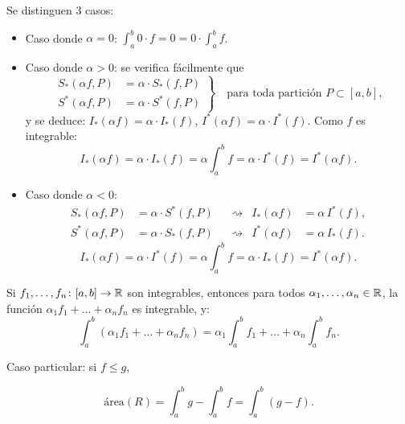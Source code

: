\documentclass[11pt,a4paper]{article}
\begin{document}
Se distinguen 3 casos:
\begin{itemize}
  \item Caso donde $\alpha=0$: $\displaystyle\int_a^b 0\cdot f=0=0\cdot\int_a^b f$.
  \item Caso donde $\alpha>0$: se verifica fácilmente que
  \[
    \left.\begin{aligned}
      S_*(\alpha f,P)&=\alpha\cdot S_*(f,P)\\
      S^*(\alpha f,P)&=\alpha\cdot S^*(f,P)
    \end{aligned}\right\}\quad\text{para toda partición } P\subset[a,b],
  \]
  y se deduce: $I_*(\alpha f)=\alpha\cdot I_*(f)$, $I^*(\alpha f)=\alpha\cdot I^*(f)$.
  Como $f$ es integrable:
  \[
    I_*(\alpha f)=\alpha\cdot I_*(f)=\alpha\int_a^b f=\alpha\cdot I^*(f)=I^*(\alpha f).
  \]
  \item Caso donde $\alpha<0$:
  \begin{align*}
    S_*(\alpha f,P)&=\alpha\cdot S^*(f,P) &&\rightsquigarrow & I_*(\alpha f)&=\alpha\, I^*(f),\\
    S^*(\alpha f,P)&=\alpha\cdot S_*(f,P) &&\rightsquigarrow & I^*(\alpha f)&=\alpha\, I_*(f).
  \end{align*}
  \[
    I_*(\alpha f)=\alpha\cdot I^*(f)=\alpha\int_a^b f=\alpha\cdot I_*(f)=I^*(\alpha f).
  \]
\end{itemize}

\begin{corolario}
Si $f_1,\dots,f_n\colon[a,b]\to\mathbb{R}$ son integrables, entonces para todos $\alpha_1,\dots,\alpha_n\in\mathbb{R}$, la función $\alpha_1f_1+\dots+\alpha_nf_n$ es integrable, y:
\[
  \int_a^b(\alpha_1f_1+\dots+\alpha_nf_n)=\alpha_1\int_a^b f_1+\dots+\alpha_n\int_a^b f_n.
\]
\end{corolario}

Caso particular: si $f\le g$,

\begin{minipage}{0.6\textwidth}
\[
  \text{área}(R)=\int_a^b g-\int_a^b f=\int_a^b(g-f).
\]
\end{minipage}\hfill
\begin{minipage}{0.35\textwidth}
\centering
{}
\end{minipage}
\end{document}
